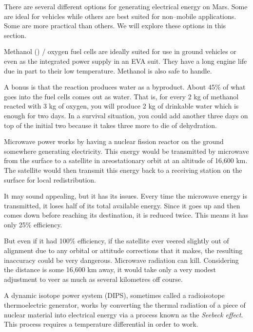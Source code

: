 

There are several different options for generating electrical energy on Mars. Some are ideal for vehicles while others are best suited for non--mobile applications. Some are more practical than others. We will explore these options in this section.

Methanol () / oxygen fuel cells are ideally suited for use in ground vehicles or even as the integrated power supply in an EVA suit. They have a long engine life due in part to their low temperature. Methanol is also safe to handle. 

A bonus is that the reaction produces water as a byproduct. About 45\% of what goes into the fuel cells comes out as water. That is, for every 2 kg of methanol reacted with 3 kg of oxygen, you will produce 2 kg of drinkable water which is enough for two days. In a survival situation, you could add another three days on top of the initial two because it takes three more to die of dehydration.

Microwave power works by having a nuclear fission reactor on the ground somewhere generating electricity. This energy would be transmitted by microwave from the surface to a satellite in areostationary orbit at an altitude of 16,600 km. The satellite would then transmit this energy back to a receiving station on the surface for local redistribution.

It may sound appealing, but it has its issues. Every time the microwave energy is transmitted, it loses half of its total available energy. Since it goes up and then comes down before reaching its destination, it is reduced twice. This means it has only 25\% efficiency.

But even if it had 100\% efficiency, if the satellite ever veered slightly out of alignment due to any orbital or attitude corrections that it makes, the resulting inaccuracy could be very dangerous. Microwave radiation can kill. Considering the distance is some 16,600 km away, it would take only a very modest adjustment to veer as much as several kilometres off course.

A dynamic isotope power system (DIPS), sometimes called a radioisotope thermoelectric generator, works by converting the thermal radiation of a piece of nuclear material into electrical energy via a process known as the {\it Seebeck effect}. This process requires a temperature differential in order to work.

